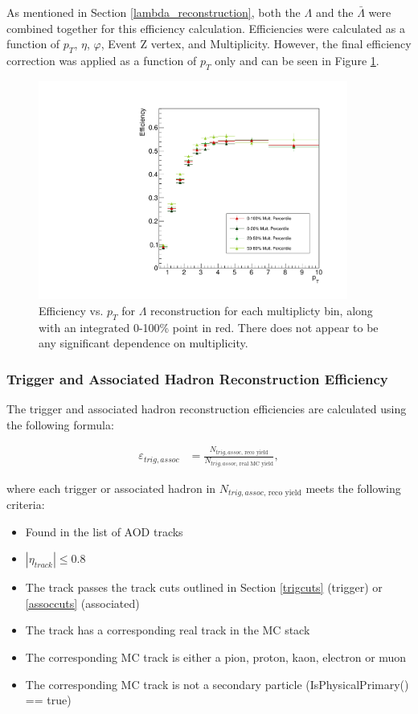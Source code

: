 \documentclass[ALICE,manyauthors]{ALICE_analysis_notes}
\begin{document}
As mentioned in Section \ref{lambda_reconstruction}, both the $\Lambda$ and the $\bar{\Lambda}$ were combined together for this efficiency calculation. Efficiencies were calculated as a function of $p_T$, $\eta$, $\varphi$, Event Z vertex, and Multiplicity. However, the final efficiency correction was applied as a function of $p_T$ only and can be seen in Figure \ref{lambda_eff}.

\begin{figure}[ht]
\centering
\includegraphics[width=4in]{figures/v0_efficiency.pdf}
\caption{Efficiency vs. $p_T$ for $\Lambda$ reconstruction for each multiplicty bin, along with an integrated 0-100\% point in red. There does not appear to be any significant dependence on multiplicity.}
\label{lambda_eff}
\end{figure}

\subsubsection{Trigger and Associated Hadron Reconstruction Efficiency}
\label{trigassoc_efficiency}

The trigger and associated hadron reconstruction efficiencies are calculated using the following formula:

\begin{align*}
	\varepsilon_{trig, assoc} &=  \frac{N_{trig, assoc\text{, reco yield}}}{N_{trig, assoc\text{, real MC yield}}},
\end{align*}

where each trigger or associated hadron in $N_{trig, assoc\text{, reco yield}}$ meets the following criteria:

\begin{itemize}
	\item Found in the list of AOD tracks
	\item $|\eta_{track}| \leq 0.8$
	\item The track passes the track cuts outlined in Section \ref{trigcuts} (trigger) or \ref{assoccuts} (associated)
	\item The track has a corresponding real track in the MC stack
	\item The corresponding MC track is either a pion, proton, kaon, electron or muon
	\item The corresponding MC track is not a secondary particle (IsPhysicalPrimary() == true)
\end{itemize}
\end{document}
